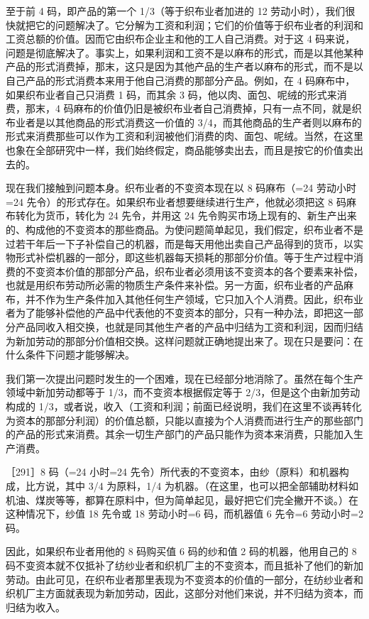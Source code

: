 至于前 4 码，即产品的第一个 1/3（等于织布业者加进的 12 劳动小时），我们很快就把它的问题解决了。它分解为工资和利润；它们的价值等于织布业者的利润和工资总额的价值。因而它由织布企业主和他的工人自己消费。对于这 4 码来说，问题是彻底解决了。事实上，如果利润和工资不是以麻布的形式，而是以其他某种产品的形式消费掉，那末，这只是因为其他产品的生产者以麻布的形式，而不是以自己产品的形式消费本来用于他自己消费的那部分产品。例如，在 4 码麻布中，如果织布业者自己只消费 1 码，而其余 3 码，他以肉、面包、呢绒的形式来消费，那末，4 码麻布的价值仍旧是被织布业者自己消费掉，只有一点不同，就是织布业者是以其他商品的形式消费这一价值的 3/4，而其他商品的生产者则以麻布的形式来消费那些可以作为工资和利润被他们消费的肉、面包、呢绒。\fontbox{~\{}当然，在这里也象在全部研究中一样，我们始终假定，商品能够卖出去，而且是按它的价值卖出去的。\fontbox{\}~}

现在我们接触到问题本身。织布业者的不变资本现在以 8 码麻布（=24 劳动小时=24 先令）的形式存在。如果织布业者想要继续进行生产，他就必须把这 8 码麻布转化为货币，转化为 24 先令，并用这 24 先令购买市场上现有的、新生产出来的、构成他的不变资本的那些商品。为使问题简单起见，我们假定，织布业者不是过若干年后一下子补偿自己的机器，而是每天用他出卖自己产品得到的货币，以实物形式补偿机器的一部分，即这些机器每天损耗的那部分价值。等于生产过程中消费的不变资本价值的那部分产品，织布业者必须用该不变资本的各个要素来补偿，也就是用织布劳动所必需的物质生产条件来补偿。另一方面，织布业者的产品麻布，并不作为生产条件加入其他任何生产领域，它只加入个人消费。因此，织布业者为了能够补偿他的产品中代表他的不变资本的部分，只有一种办法，即把这一部分产品同收入相交换，也就是同其他生产者的产品中归结为工资和利润，因而归结为新加劳动的那部分价值相交换。这样问题就正确地提出来了。现在只是要问：在什么条件下问题才能够解决。

我们第一次提出问题时发生的一个困难，现在已经部分地消除了。虽然在每个生产领域中新加劳动都等于 1/3，而不变资本根据假定等于 2/3，但是这个由新加劳动构成的 1/3，或者说，收入（工资和利润；前面已经说明，我们在这里不谈再转化为资本的那部分利润）的价值总额，只能以直接为个人消费而进行生产的那些部门的产品的形式来消费。其余一切生产部门的产品只能作为资本来消费，只能加入生产消费。

［291］8 码（=24 小时=24 先令）所代表的不变资本，由纱（原料）和机器构成，比方说，其中 3/4 为原料，1/4 为机器。（在这里，也可以把全部辅助材料如机油、煤炭等等，都算在原料中，但为简单起见，最好把它们完全撇开不谈。）在这种情况下，纱值 18 先令或 18 劳动小时=6 码，而机器值 6 先令=6 劳动小时=2 码。

因此，如果织布业者用他的 8 码购买值 6 码的纱和值 2 码的机器，他用自己的 8 码不变资本就不仅抵补了纺纱业者和织机厂主的不变资本，而且抵补了他们的新加劳动。由此可见，在织布业者那里表现为不变资本的价值的一部分，在纺纱业者和织机厂主方面就表现为新加劳动，因此，这部分对他们来说，并不归结为资本，而归结为收入。

